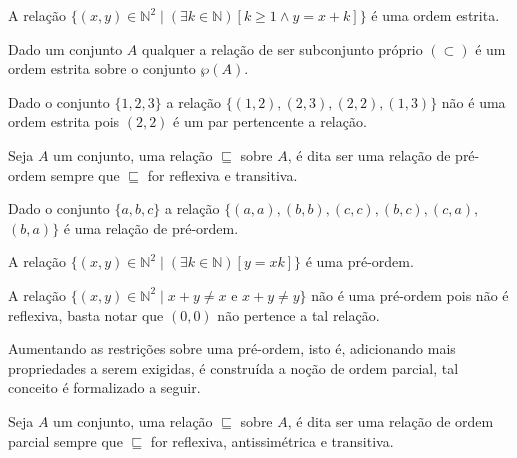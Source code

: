 \begin{exemplo}
	A relação $\{(x, y) \in \mathbb{N}^2 \mid (\exists k \in \mathbb{N})[k \geq 1 \land y = x + k	]\}$ é uma ordem estrita.
\end{exemplo}

\begin{exemplo}
	Dado um conjunto $A$ qualquer a relação de ser subconjunto próprio $(\subset)$ é um ordem estrita sobre o conjunto $\wp(A)$.
\end{exemplo}

\begin{exemplo}
	Dado o conjunto $\{1, 2, 3\}$ a relação $\{(1, 2), (2, 3), (2, 2), (1, 3)\}$ não é uma ordem estrita pois $(2, 2)$ é um par pertencente a relação.
\end{exemplo}

\begin{definicao}\label{def:PreOrdem}
	Seja $A$ um conjunto, uma relação $\sqsubseteq$ sobre $A$, é dita ser uma relação de pré-ordem sempre que $\sqsubseteq$ for reflexiva e transitiva.
\end{definicao}

\begin{exemplo}
	Dado o conjunto $\{a, b, c\}$ a relação $\{(a, a), (b, b), (c, c), (b, c), (c, a),$ $(b, a)\}$ é uma relação de pré-ordem.
\end{exemplo}

\begin{exemplo}
	A relação $\{(x, y) \in \mathbb{N}^2 \mid (\exists k \in \mathbb{N})[y = xk]\}$ é uma pré-ordem.
\end{exemplo}

\begin{exemplo}
	A relação $\{(x, y) \in \mathbb{N}^2 \mid x + y \neq x \text{ e } x + y \neq y\}$ não é uma pré-ordem pois não é reflexiva, basta notar que $(0,0)$ não pertence a tal relação.
\end{exemplo}

Aumentando as restrições sobre uma pré-ordem, isto é, adicionando mais propriedades a serem exigidas, é construída a noção de ordem parcial, tal conceito é formalizado a seguir. 

\begin{definicao}\label{def:OrdemParcial}
	Seja $A$ um conjunto, uma relação $\sqsubseteq$ sobre $A$, é dita ser uma relação de ordem parcial sempre que $\sqsubseteq$ for reflexiva, antissimétrica e transitiva.
\end{definicao}

